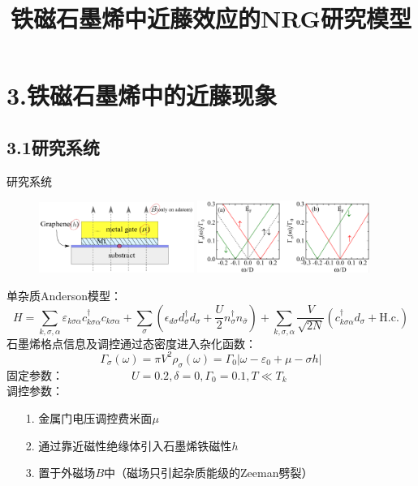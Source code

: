 \documentclass[9pt,t]{beamer} %
\begin{document}
\section{3.铁磁石墨烯中的近藤现象}
\subsection{3.1研究系统}
\begin{frame}
\tableofcontents[currentsection] 
\end{frame}

\title{铁磁石墨烯中近藤效应的NRG研究\qquad \qquad \qquad \qquad 模型}
\begin{frame}{研究系统}
\begin{figure}
\includegraphics[width=0.45\textwidth]{setup.png}
\includegraphics[width=0.5\textwidth]{fig1.png}
\end{figure}
单杂质Anderson模型：
\[
H=\sum_{k, \sigma, \alpha} \varepsilon_{k \sigma \alpha} c_{k \sigma \alpha}^{\dagger} c_{k \sigma \alpha}+\sum_{\sigma}\left(\epsilon_{d \sigma} d_{\sigma}^{\dagger} d_{\sigma}+\frac{U}{2} n_{\sigma}^{\dagger} n_{\bar{\sigma}}\right)+\sum_{k, \sigma, \alpha} \frac{V}{\sqrt{2 N}}\left(c_{k \sigma \alpha}^{\dagger} d_{\sigma}+\mathrm{H.c.}\right)
\]
石墨烯格点信息及调控通过态密度进入杂化函数：
\[
\Gamma_{\sigma}(\omega)=\pi V^{2} \rho_{\sigma}(\omega) = \Gamma_{0}\left|\omega-\varepsilon_{0}+\mu-\sigma h\right|
\]
固定参数：$\qquad \qquad \qquad U=0.2,\delta=0,\Gamma_{0}=0.1,T\ll T_{k}$\\
调控参数：
\begin{itemize}
\setlength\itemsep{0.4em}
\item[1.] 金属门电压调控费米面$\mu$
\item[2.] 通过靠近磁性绝缘体引入石墨烯铁磁性$h$
\item[3.] 置于外磁场$B$中（磁场只引起杂质能级的Zeeman劈裂）
\end{itemize}
\end{frame}
\end{document}
